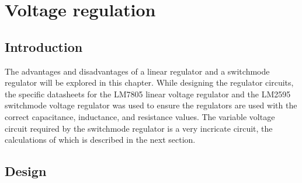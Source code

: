 \chapter{Voltage regulation}\label{ch:voltageRegulation}

\section{Introduction} \label{sec:voltIntro}

The advantages and disadvantages of a linear regulator and a switchmode regulator will be explored in this chapter. While designing the regulator circuits, the specific datasheets for the LM7805 linear voltage regulator\cite{LM7805} and the LM2595 switchmode voltage regulator\cite{LM2595} was used to ensure the regulators are used with the correct capacitance, inductance, and resistance values. The variable voltage circuit required by the switchmode regulator\cite{LM2595} is a very incricate circuit, the calculations of which is described in the next section.

\section{Design} \label{sec:voltDesign}

